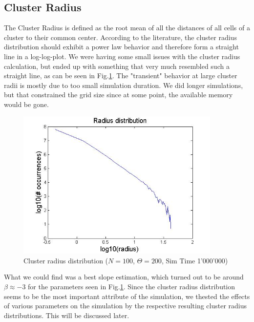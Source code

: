 \documentclass[11pt]{article}
\begin{document}
\subsection{Cluster Radius}
The Cluster Radius is defined as the root mean of all the distances of all cells of a cluster to their common center. According to the literature, the cluster radius distribution should exhibit a power law behavior and therefore form a straight line in a log-log-plot. We were having some small issues with the cluster radius calculation, but ended up with something that very much resembled such a straight line, as can be seen in Fig.\ref{raddist1}. The "transient" behavior at large cluster radii is mostly due to too small simulation duration. We did longer simulations, but that constrained the grid size since at some point, the available memory would be gone. 
\begin{figure}[H]
\includegraphics[width=0.9\textwidth,keepaspectratio=true]{Pictures/RadiusDist_100_200_1M.jpg}
\caption{Cluster radius distribution ($N=100$, $\Theta=200$, Sim Time 1'000'000)}
\label{raddist1}
\end{figure}
What we could find was a best slope estimation, which turned out to be around $\beta \approx -3$ for the parameters seen in Fig.\ref{raddist1}. Since the cluster radius distribution seems to be the most important attribute of the simulation, we thested the effects of various parameters on the simulation by the respective resulting cluster radius distributions. This will be discussed later.
\end{document}
